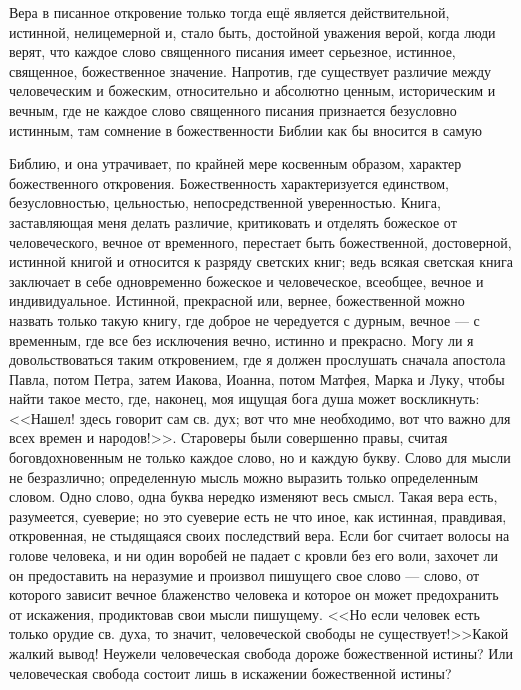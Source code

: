\documentclass[12pt,oneside]{book}
\begin{document}
Вера в писанное откровение только тогда ещё является действительной, истинной, нелицемерной и, стало быть, достойной уважения верой, когда люди верят, что каждое слово священного писания имеет серьезное, истинное, священное, божественное значение. Напротив, где существует различие между человеческим и божеским, относительно и абсолютно ценным, историческим и вечным, где не каждое слово священного писания признается безусловно истинным, там сомнение в божественности Библии как бы вносится в самую

Библию, и она утрачивает, по крайней мере косвенным образом, характер божественного откровения. Божественность характеризуется единством, безусловностью, цельностью, непосредственной уверенностью. Книга, заставляющая меня делать различие, критиковать и отделять божеское от человеческого, вечное от временного, перестает быть божественной, достоверной, истинной книгой и относится к разряду светских книг; ведь всякая светская книга заключает в себе одновременно божеское и человеческое, всеобщее, вечное и индивидуальное. Истинной, прекрасной или, вернее, божественной можно назвать только такую книгу, где доброе не чередуется с дурным, вечное --- с временным, где все без исключения вечно, истинно и прекрасно. Могу ли я довольствоваться таким откровением, где я должен прослушать сначала апостола Павла, потом Петра, затем Иакова, Иоанна, потом Матфея, Марка и Луку, чтобы найти такое место, где, наконец, моя ищущая бога душа может воскликнуть: <<Нашел! здесь говорит сам св. дух; вот что мне необходимо, вот что важно для всех времен и народов!>>. Староверы были совершенно правы, считая боговдохновенным не только каждое слово, но и каждую букву. Слово для мысли не безразлично; определенную мысль можно выразить только определенным словом. Одно слово, одна буква нередко изменяют весь смысл. Такая вера есть, разумеется, суеверие; но это суеверие есть не что иное, как истинная, правдивая, откровенная, не стыдящаяся своих последствий вера. Если бог считает волосы на голове человека, и ни один воробей не падает с кровли без его воли, захочет ли он предоставить на неразумие и произвол пишущего свое слово --- слово, от которого зависит вечное блаженство человека и которое он может предохранить от искажения, продиктовав свои мысли пишущему. <<Но если человек есть только орудие св. духа, то значит, человеческой свободы не существует!>>\dag\let\svthefootnote\thefootnote\let\thefootnote\relax{}\let\thefootnote\svthefootnote Какой жалкий вывод! Неужели человеческая свобода дороже божественной истины? Или человеческая свобода состоит лишь в искажении божественной истины?
\end{document}
